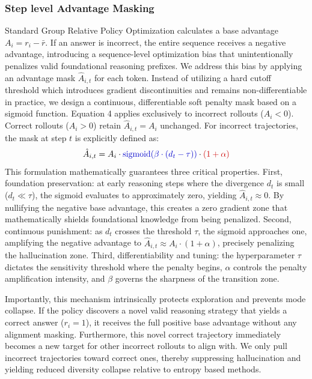 \documentclass[conference]{IEEEtran}
\begin{document}
\subsubsection{Step level Advantage Masking}
Standard Group Relative Policy Optimization calculates a base advantage $A_i = r_i - \bar{r}$. If an answer is incorrect, the entire sequence receives a negative advantage, introducing a sequence-level optimization bias that unintentionally penalizes valid foundational reasoning prefixes. We address this bias by applying an advantage mask $\hat{A}_{i,t}$ for each token. Instead of utilizing a hard cutoff threshold which introduces gradient discontinuities and remains non-differentiable in practice, we design a continuous, differentiable soft penalty mask based on a sigmoid function. Equation 4 applies exclusively to incorrect rollouts ($A_i < 0$). Correct rollouts ($A_i > 0$) retain $\hat{A}_{i,t} = A_i$ unchanged. For incorrect trajectories, the mask at step $t$ is explicitly defined as:
\begin{equation}
\hat{A}_{i,t} = A_i \cdot
  \textcolor{blue!80!black}{\mathrm{sigmoid}(\beta \cdot (d_t - \tau))}
  \cdot \textcolor{red!80!black}{(1 + \alpha)}
\end{equation}
This formulation mathematically guarantees three critical properties. First, foundation preservation: at early reasoning steps where the divergence $d_t$ is small ($d_t \ll \tau$), the sigmoid evaluates to approximately zero, yielding $\hat{A}_{i,t} \approx 0$. By nullifying the negative base advantage, this creates a zero gradient zone that mathematically shields foundational knowledge from being penalized. Second, continuous punishment: as $d_t$ crosses the threshold $\tau$, the sigmoid approaches one, amplifying the negative advantage to $\hat{A}_{i,t} \approx A_i \cdot (1 + \alpha)$, precisely penalizing the hallucination zone. Third, differentiability and tuning: the hyperparameter $\tau$ dictates the sensitivity threshold where the penalty begins, $\alpha$ controls the penalty amplification intensity, and $\beta$ governs the sharpness of the transition zone.

Importantly, this mechanism intrinsically protects exploration and prevents mode collapse. If the policy discovers a novel valid reasoning strategy that yields a correct answer ($r_i = 1$), it receives the full positive base advantage without any alignment masking. Furthermore, this novel correct trajectory immediately becomes a new target for other incorrect rollouts to align with. We only pull incorrect trajectories toward correct ones, thereby suppressing hallucination and yielding reduced diversity collapse relative to entropy based methods.
\end{document}
